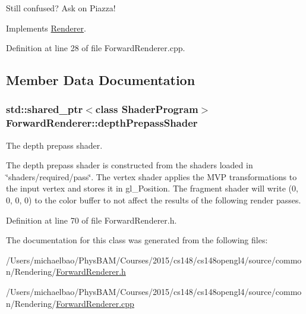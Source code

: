 Still confused? Ask on Piazza! 

Implements \hyperlink{class_renderer_a38623da22aa718cfa41e2514ebd269f5}{Renderer}.



Definition at line 28 of file Forward\+Renderer.\+cpp.



\subsection{Member Data Documentation}
\hypertarget{class_forward_renderer_a8f703bc4c646416804bc82f4d220a648}{}
\subsubsection[{depth\+Prepass\+Shader}]{\setlength{\rightskip}{0pt plus 5cm}std\+::shared\+\_\+ptr$<$class {\bf Shader\+Program}$>$ Forward\+Renderer\+::depth\+Prepass\+Shader\hspace{0.3cm}{\ttfamily [protected]}}\label{class_forward_renderer_a8f703bc4c646416804bc82f4d220a648}


The depth prepass shader. 

The depth prepass shader is constructed from the shaders loaded in \char`\"{}shaders/required/pass\char`\"{}. The vertex shader applies the M\+V\+P transformations to the input vertex and stores it in gl\+\_\+\+Position. The fragment shader will write (0, 0, 0, 0) to the color buffer to not affect the results of the following render passes. 

Definition at line 70 of file Forward\+Renderer.\+h.



The documentation for this class was generated from the following files\+:\begin{DoxyCompactItemize}
\item 
/\+Users/michaelbao/\+Phys\+B\+A\+M/\+Courses/2015/cs148/cs148opengl4/source/common/\+Rendering/\hyperlink{_forward_renderer_8h}{Forward\+Renderer.\+h}\item 
/\+Users/michaelbao/\+Phys\+B\+A\+M/\+Courses/2015/cs148/cs148opengl4/source/common/\+Rendering/\hyperlink{_forward_renderer_8cpp}{Forward\+Renderer.\+cpp}\end{DoxyCompactItemize}
